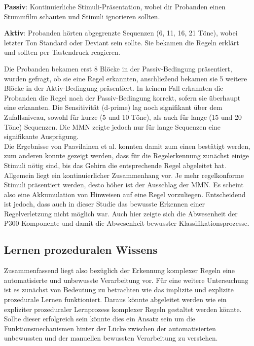\documentclass[doc,a4paper,12pt]{apa6}
\begin{document}
\begin{compactitem}
  \item \textbf{Passiv}: Kontinuierliche Stimuli-Präsentation, wobei dir Probanden einen Stummfilm schauten und Stimuli ignorieren sollten.
  \item \textbf{Aktiv}: Probanden hörten abgegrenzte Sequenzen (6, 11, 16, 21 Töne), wobei letzter Ton Standard oder Deviant sein sollte. Sie bekamen die Regeln erklärt und sollten per Tastendruck reagieren.
\end{compactitem}

Die Probanden bekamen erst 8 Blöcke in der Passiv-Bedingung präsentiert, wurden gefragt, ob sie eine Regel erkannten, anschließend bekamen sie 5 weitere Blöcke in der Aktiv-Bedingung präsentiert. In keinem Fall erkannten die Probanden die Regel nach der Passiv-Bedingung korrekt, sofern sie überhaupt eine erkannten. Die Sensitivität (d-prime) lag noch signifikant über dem Zufallsniveau, sowohl für kurze (5 und 10 Töne), als auch für lange (15 und 20 Töne) Sequenzen. Die MMN zeigte jedoch nur für lange Sequenzen eine signifikante Ausprägung.\\
Die Ergebnisse von Paavilainen et al. konnten damit zum einen bestätigt werden, zum anderen konnte gezeigt werden, dass für die Regelerkennung zunächst einige Stimuli nötig sind, bis das Gehirn die entsprechende Regel abgeleitet hat. Allgemein liegt ein kontinuierlicher Zusammenhang vor. Je mehr regelkonforme Stimuli präsentiert werden, desto höher ist der Ausschlag der MMN. Es scheint also eine Akkumulation von Hinweisen auf eine Regel vorzuliegen. Entscheidend ist jedoch, dass auch in dieser Studie das bewusste Erkennen einer Regelverletzung nicht möglich war. Auch hier zeigte sich die Abwesenheit der P300-Komponente und damit die Abwesenheit bewusster Klassifikationsprozesse.


\subsection{Lernen prozeduralen Wissens}

Zusammenfassend liegt also bezüglich der Erkennung komplexer Regeln eine automatisierte und unbewusste Verarbeitung vor. Für eine weitere Untersuchung ist es zunächst von Bedeutung zu betrachten wie das implizite und explizite prozedurale Lernen funktioniert. Daraus könnte abgeleitet werden wie ein expliziter prozeduraler Lernprozess komplexer Regeln gestaltet werden könnte. Sollte dieser erfolgreich sein könnte dies ein Ansatz sein um die Funktionsmechanismen hinter der Lücke zwischen der automatisierten unbewussten und der manuellen bewussten Verarbeitung zu verstehen.
\end{document}
